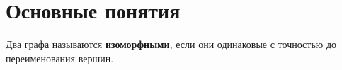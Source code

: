 \section{Основные понятия}

Два графа называются \textbf{изоморфными}, если они одинаковые с точностью до переименования вершин.
